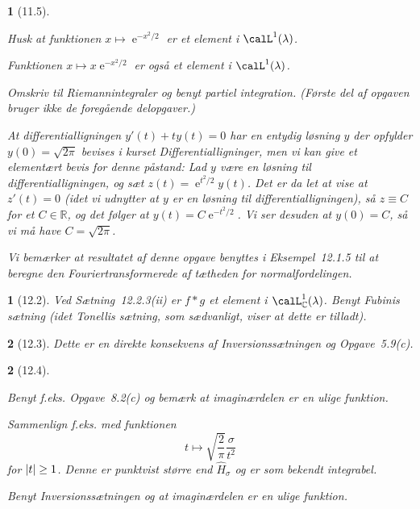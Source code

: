\documentclass[a4paper, 11pt, article, danish, oneside]{memoir}
\newcommand{\reals}{\mathbb{R}}
\newcommand{\complex}{\mathbb{C}}
\newcommand{\blank}{\mathrel{\;\cdot\;}}
\newcommand{\blankifempty}[1]{\ifstrempty{#1}{\blank}{#1}}
\DeclarePairedDelimiter{\auxdelimlvert}{\lvert}{\rvert}
\newcommand{\abs}[2][]{\auxdelimlvert[#1]{\blankifempty{#2}}}
\DeclareMathOperator{\e}{\mathrm{e}}
\newcommand{\pencilsymbol}{\raisebox{-2pt}{\normalfont\PencilLeft}}
\theoremstyle{changedotcustomnumber}
\newtheorem{opgave}{\pencilsymbol}
\theoremstyle{changedotbreakcustomnumber}
\newtheorem{opgavebreak}{\pencilsymbol}
\begin{document}
\begin{opgavebreak}[11.5]
\begin{solutionsec}
    \item Husk at funktionen $x \mapsto \e^{-x^2/2}$ er et element i $\calL^1(\lambda)$.

    \item Funktionen $x \mapsto x \e^{-x^2/2}$ er også et element i $\calL^1(\lambda)$.

    \item Omskriv til Riemannintegraler og benyt partiel integration. (Første del af opgaven bruger ikke de foregående delopgaver.)

    \item At differentialligningen $y'(t) + ty(t) = 0$ har en entydig løsning $y$ der opfylder $y(0) = \sqrt{2\pi}$ bevises i kurset \emph{Differentialligninger}, men vi kan give et elementært bevis for denne påstand: Lad $y$ være en løsning til differentialligningen, og sæt $z(t) = \e^{t^2/2}y(t)$. Det er da let at vise at $z'(t) = 0$ (idet vi udnytter at $y$ er en løsning til differentialligningen), så $z \equiv C$ for et $C \in \reals$, og det følger at $y(t) = C \e^{-t^2/2}$. Vi ser desuden at $y(0) = C$, så vi må have $C = \sqrt{2\pi}$.
    
    Vi bemærker at resultatet af denne opgave benyttes i Eksempel~12.1.5 til at beregne den Fouriertransformerede af tætheden for normalfordelingen.
\end{solutionsec}
\end{opgavebreak}


\begin{opgave}[12.2]
    Ved Sætning~12.2.3(ii) er $f * g$ et element i $\calL^1_\complex(\lambda)$. Benyt Fubinis sætning (idet Tonellis sætning, som sædvanligt, viser at dette er tilladt).
\end{opgave}


\begin{opgave}[12.3]
    Dette er en direkte konsekvens af Inversionssætningen og Opgave~5.9(c).
\end{opgave}


\begin{opgavebreak}[12.4]
\begin{solutionsec}
    \item Benyt f.eks. Opgave~8.2(c) og bemærk at imaginærdelen er en ulige funktion.

    \item Sammenlign f.eks. med funktionen
    \begin{equation*}
        t
            \mapsto \sqrt{\frac{2}{\pi}} \frac{\sigma}{t^2}
    \end{equation*}
    for $\abs{t} \geq 1$. Denne er punktvist større end $\widehat{H}_\sigma$ og er som bekendt integrabel.

    \item Benyt Inversionssætningen og at imaginærdelen er en ulige funktion.
\end{solutionsec}
\end{opgavebreak}
\end{document}
